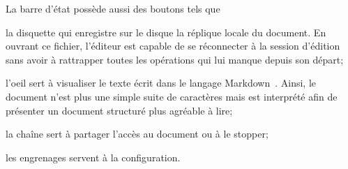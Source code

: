 La barre d'état possède aussi des boutons tels que
\begin{inparaenum}[(i)]
\item la disquette qui enregistre sur le disque la réplique locale du
  document. En ouvrant ce fichier, l'éditeur est capable de se réconnecter à la
  session d'édition sans avoir à rattrapper toutes les opérations qui lui manque
  depuis son départ;
\item l'oeil sert à visualiser le texte écrit dans le langage
  Markdown~\cite{markdown}. Ainsi, le document n'est plus une simple suite de
  caractères mais est interprété afin de présenter un document structuré plus
  agréable à lire;
\item la chaîne sert à partager l'accès au document ou à le stopper;
\item les engrenages servent à la configuration.
\end{inparaenum}


